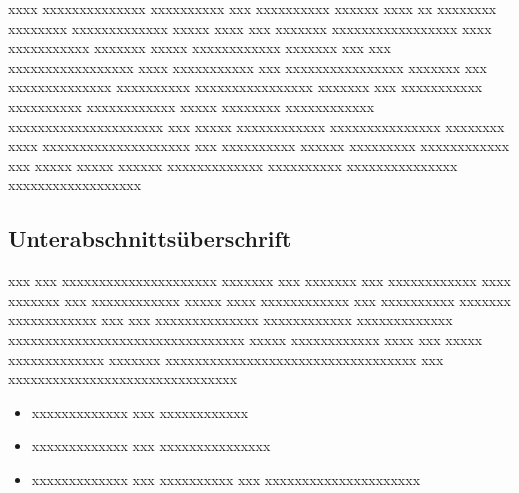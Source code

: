 xxxx xxxxxxxxxxxxxx xxxxxxxxxx xxx xxxxxxxxxx xxxxxx xxxx xx xxxxxxxx xxxxxxxx xxxxxxxxxxxxx xxxxx xxxx xxx xxxxxxx xxxxxxxxxxxxxxxxx xxxx xxxxxxxxxxx xxxxxxx xxxxx xxxxxxxxxxxx xxxxxxx xxx xxx xxxxxxxxxxxxxxxxx xxxx xxxxxxxxxxx xxx xxxxxxxxxxxxxxxx xxxxxxx xxx xxxxxxxxxxxxxx xxxxxxxxxx xxxxxxxxxxxxxxxx xxxxxxx xxx xxxxxxxxxxx xxxxxxxxxx xxxxxxxxxxxx xxxxx xxxxxxxx xxxxxxxxxxxx xxxxxxxxxxxxxxxxxxxxx xxx xxxxx xxxxxxxxxxxx xxxxxxxxxxxxxxx xxxxxxxx xxxx xxxxxxxxxxxxxxxxxxxx xxx xxxxxxxxxx xxxxxx xxxxxxxxx xxxxxxxxxxxx xxx xxxxx xxxxx xxxxxx xxxxxxxxxxxxx xxxxxxxxxx xxxxxxxxxxxxxxx xxxxxxxxxxxxxxxxxx
\subsection{Unterabschnittsüberschrift}\label{sec:xxxxxxxx}
xxx xxx xxxxxxxxxxxxxxxxxxxxx xxxxxxx xxx xxxxxxx xxx xxxxxxxxxxxx xxxx xxxxxxx xxx xxxxxxxxxxxx xxxxx xxxx xxxxxxxxxxxx xxx xxxxxxxxxx xxxxxxx xxxxxxxxxxxx xxx xxx xxxxxxxxxxxxxx xxxxxxxxxxxx xxxxxxxxxxxxx xxxxxxxxxxxxxxxxxxxxxxxxxxxxxxxx xxxxx xxxxxxxxxxxx xxxx xxx xxxxx xxxxxxxxxxxxx xxxxxxx xxxxxxxxxxxxxxxxxxxxxxxxxxxxxxxxxx xxx xxxxxxxxxxxxxxxxxxxxxxxxxxxxxxx
\begin{itemize}
   \item xxxxxxxxxxxxx xxx xxxxxxxxxxxx
   \item xxxxxxxxxxxxx xxx xxxxxxxxxxxxxxx
   \item xxxxxxxxxxxxx xxx xxxxxxxxxx xxx xxxxxxxxxxxxxxxxxxxxx
\end{itemize}

